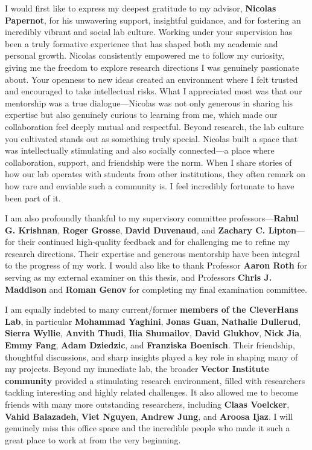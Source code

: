 \noindent I would first like to express my deepest gratitude to my advisor, \textbf{Nicolas Papernot}, for his unwavering support, insightful guidance, and for fostering an incredibly vibrant and social lab culture. Working under your supervision has been a truly formative experience that has shaped both my academic and personal growth. Nicolas consistently empowered me to follow my curiosity, giving me the freedom to explore research directions I was genuinely passionate about. Your openness to new ideas created an environment where I felt trusted and encouraged to take intellectual risks. What I appreciated most was that our mentorship was a true dialogue—Nicolas was not only generous in sharing his expertise but also genuinely curious to learning from me, which made our collaboration feel deeply mutual and respectful. Beyond research, the lab culture you cultivated stands out as something truly special. Nicolas built a space that was intellectually stimulating and also socially connected—a place where collaboration, support, and friendship were the norm. When I share stories of how our lab operates with students from other institutions, they often remark on how rare and enviable such a community is. I feel incredibly fortunate to have been part of it.

I am also profoundly thankful to my supervisory committee professors—\textbf{Rahul G. Krishnan}, \textbf{Roger Grosse}, \textbf{David Duvenaud}, and \textbf{Zachary C. Lipton}—for their continued high-quality feedback and for challenging me to refine my research directions. Their expertise and generous mentorship have been integral to the progress of my work. I would also like to thank Professor \textbf{Aaron Roth} for serving as my external examiner on this thesis, and Professors \textbf{Chris J. Maddison} and \textbf{Roman Genov} for completing my final examination committee.

I am equally indebted to many current/former \textbf{members of the CleverHans Lab}, in particular \textbf{Mohammad Yaghini}, \textbf{Jonas Guan}, \textbf{Nathalie Dullerud}, \textbf{Sierra Wyllie}, \textbf{Anvith Thudi}, \textbf{Ilia Shumailov}, \textbf{David Glukhov}, \textbf{Nick Jia}, \textbf{Emmy Fang}, \textbf{Adam Dziedzic}, and \textbf{Franziska Boenisch}. Their friendship, thoughtful discussions, and sharp insights played a key role in shaping many of my projects. Beyond my immediate lab, the broader \textbf{Vector Institute community} provided a stimulating research environment, filled with researchers tackling interesting and highly related challenges. It also allowed me to become friends with many more outstanding researchers, including \textbf{Claas Voelcker}, \textbf{Vahid Balazadeh}, \textbf{Viet Nguyen}, \textbf{Andrew Jung}, and \textbf{Aroosa Ijaz}. I will genuinely miss this office space and the incredible people who made it such a great place to work at from the very beginning.

